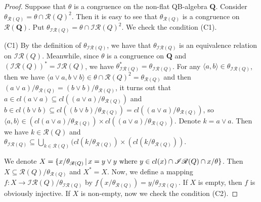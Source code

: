 \documentclass[12pt]{amsart}
\theoremstyle{definition}
\theoremstyle{remark}
\numberwithin{equation}{section}
\begin{document}
\begin{proof}
Suppose that $\theta$ is a congruence on the non-flat QB-algebra $\mathbf{Q}$. Consider $\theta_{\mathscr{R}(Q)}=\theta \cap \mathscr{R}(Q)^{2}$.  Then it is easy to see that $\theta_{\mathscr{R}(Q)}$ is a congruence on $\mathscr{R}(\mathbf{Q})$.
Put $\theta_{\mathscr{IR}(Q)}=\theta \cap \mathscr{IR}(Q)^{2}$. We check the condition (C1).

(C1) By the definition of $\theta_{\mathscr{IR}(Q)}$, we have that $\theta_{\mathscr{IR}(Q)}$ is an equivalence relation on $\mathscr{IR}(Q)$. Meanwhile, since $\theta$ is a congruence on $\mathbf{Q}$ and $(\mathscr{IR}(Q))^{\ast}=\mathscr{IR}(Q)$, we have $\theta_{\mathscr{IR}(Q)}^{\ast}=\theta_{\mathscr{IR}(Q)}$. For any $\langle a,b\rangle\in \theta_{\mathscr{IR}(Q)}$, then we have $\langle a\vee a,b\vee b\rangle\in \theta\cap \mathscr{R}(Q)^{2}= \theta_{\mathscr{R}(Q)}$ and then $(a\vee a)/\theta_{\mathscr{R}(Q)}=(b\vee b)/\theta_{\mathscr{R}(Q)}$, it turns out that $a\in cl(a\vee a)\subseteq cl((a\vee a)/\theta_{\mathscr{R}(Q)})$ and $b\in cl(b\vee b)\subseteq cl((b\vee b)/\theta_{\mathscr{R}(Q)})=cl((a\vee a)/\theta_{\mathscr{R}(Q)})$, so $\langle a,b \rangle \in (cl(a\vee a)/\theta_{\mathscr{R}(Q)})\times cl((a\vee a)/\theta_{\mathscr{R}(Q)})$. Denote $k=a\vee a$. Then we have $k\in \mathscr{R}(Q)$ and $\theta_{\mathscr{IR}(Q)}\subseteq \bigcup_{k\in \mathscr{R}({Q})}(cl(k/\theta_{\mathscr{R}(Q)})\times (cl(k/\theta_{\mathscr{R}(Q)}))$.

We denote $X=\{x/\theta_{\mathscr{R}(Q)} \,|\, x=y\vee y \hbox{\ where\ } y \in cl(x)\cap\mathscr{IR}(Q)\cap x/\theta\}$. Then $X\subseteq \mathscr{R}(Q)/\theta_{\mathscr{R}(Q)}$ and $X^{\ast}=X$.
Now, we define a mapping $f:X\rightarrow \mathscr{IR}(Q)/\theta_{\mathscr{IR}(Q)}$ by $f(x/\theta_{\mathscr{R}(Q)})=y/\theta_{\mathscr{IR}(Q)}$. If $X$ is empty, then $f$ is obviously injective. If $X$ is non-empty, now we check the condition (C2).


\end{proof}
\end{document}
